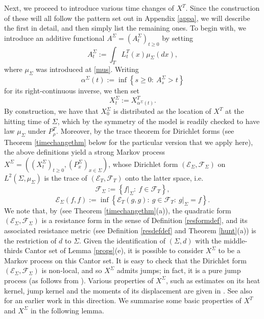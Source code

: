 \documentclass[a4paper, 11pt]{article}
\begin{document}
Next, we proceed to introduce various time changes of $X^T$. Since the construction of these will all follow the pattern set out in Appendix \ref{appa}, we will describe the first in detail, and then simply list the remaining ones. To begin with, we introduce an additive functional $A^\Sigma=(A^\Sigma_t)_{t\geq 0}$ by setting
\begin{equation}\label{asig}
A^\Sigma_t:=\int_TL_t^T(x)\mu_\Sigma(dx),
\end{equation}
where $\mu_\Sigma$ was introduced at \eqref{mus}. Writing
\begin{equation}\label{alphasig}
\alpha^\Sigma(t):=\inf\left\{s\geq 0:\:A^\Sigma_s>t\right\}
\end{equation}
for its right-continuous inverse, we then set
\begin{equation}\label{xsigdef}
X^\Sigma_t:=X^T_{\alpha^\Sigma(t)}.
\end{equation}
By construction, we have that $X^\Sigma_0$ is distributed as the location of $X^T$ at the hitting time of $\Sigma$, which by the symmetry of the model is readily checked to have law $\mu_\Sigma$ under $P_\rho^T$. Moreover, by the trace theorem for Dirichlet forms \cite[Theorem 6.2.1]{FOT} (see Theorem \ref{timechangethm} below for the particular version that we apply here), the above definitions yield a strong Markov process $X^\Sigma=((X^\Sigma_t)_{t\geq 0},(P^\Sigma_x)_{x\in \Sigma})$, whose Dirichlet form $(\mathcal{E}_\Sigma,\mathcal{F}_\Sigma)$ on $L^2(\Sigma,\mu_\Sigma)$ is the trace of $(\mathcal{E}_T,\mathcal{F}_T)$ onto the latter space, i.e.\
\[\mathcal{F}_\Sigma:=\left\{f|_\Sigma:\:f\in \mathcal{F}_T\right\},\]
\begin{equation}\label{xsigform}
\mathcal{E}_\Sigma(f,f):=\inf\left\{\mathcal{E}_T(g,g):\:g\in\mathcal{F}_T:\:g|_\Sigma=f\right\}.
\end{equation}
We note that, by \cite[Theorem 8.4]{Kigres} (see Theorem \ref{timechangethm}(a)), the quadratic form $(\mathcal{E}_\Sigma,\mathcal{F}_\Sigma)$ is a resistance form in the sense of Definition \ref{resformdef}, and its associated resistance metric (see Definition \ref{resdefdef} and Theorem \ref{hunt}(a)) is the restriction of $d$ to $\Sigma$. Given the identification of $(\Sigma,d)$ with the middle-thirds Cantor set of Lemma \ref{props}(e), it is possible to consider $X^\Sigma$ to be a Markov process on this Cantor set. It is easy to check that the Dirichlet form $(\mathcal{E}_\Sigma,\mathcal{F}_\Sigma)$ is non-local, and so $X^\Sigma$ admits jumps; in fact, it is a pure jump process (as follows from \cite[Theorem 5.6]{Kigbound}). Various properties of $X^\Sigma$, such as estimates on its heat kernel, jump kernel and the moments of its displacement are given in \cite{Kigbound}. See also \cite{Baxter} for an earlier work in this direction. We summarise some basic properties of $X^T$ and $X^\Sigma$ in the following lemma.
\end{document}
